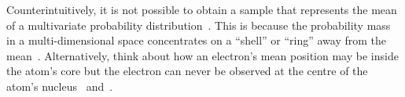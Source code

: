 Counterintuitively, it is not possible to obtain a sample that represents the mean of a multivariate probability distribution~\cite[Sec.~3.1]{VershyninMultiD2018}.
This is because the probability mass in a multi-dimensional space concentrates on a “shell” or “ring” away from the mean~\cite{VowelsMultiD}.
Alternatively, think about how an electron's mean position may be inside the atom's core but the electron can never be observed at the centre of the atom's nucleus~\cite[Chapter 4]{griffiths_introduction_2018} and~\cite[Fig.~4]{ElectronBessel}.



